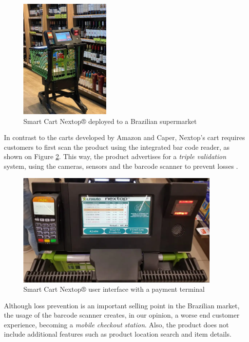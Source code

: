 \documentclass[openright]{normas-utf-tex} %
\begin{document}
\begin{figure}[H]
	\centering
	\includegraphics[width=0.4\textwidth]{./images/nextop.jpeg}
	\caption[Smart Cart Nextop® deployed to a Brazilian supermarket]{Smart Cart Nextop® deployed to a Brazilian supermarket}
	\label{fig:nextop}
\end{figure}

In contrast to the carts developed by Amazon and Caper, Nextop's cart
requires customers to first scan the product using the integrated bar code
reader, as shown on Figure \ref{fig:nextopui}. This way, the product advertises for a
\textit{triple validation} system, using the cameras, sensors and the barcode scanner 
to prevent losses \cite{Nextop2022}.

\begin{figure}[H]
	\centering
	\includegraphics[width=0.9\textwidth]{./images/nextop2.png}
    \caption[Smart Cart Nextop® user interface with a payment terminal]{Smart Cart Nextop® user interface with a payment terminal}
	\label{fig:nextopui}
\end{figure}

Although loss prevention is an important selling point in the Brazilian market,
the usage of the barcode scanner creates, in our opinion, a worse end customer
experience, becoming a \textit{mobile checkout station}. Also, the product does not
include additional features such as product location search and item details. 
\end{document}
